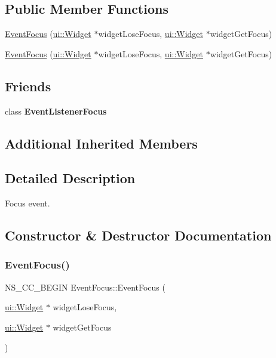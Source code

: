 \subsection*{Public Member Functions}
\begin{DoxyCompactItemize}
\item 
\hyperlink{classEventFocus_a3da2c04c020ed8e0ba5515ab065bf15e}{Event\+Focus} (\hyperlink{classui_1_1Widget}{ui\+::\+Widget} $\ast$widget\+Lose\+Focus, \hyperlink{classui_1_1Widget}{ui\+::\+Widget} $\ast$widget\+Get\+Focus)
\item 
\hyperlink{classEventFocus_ac1ec32650429e3751658af171b495a2f}{Event\+Focus} (\hyperlink{classui_1_1Widget}{ui\+::\+Widget} $\ast$widget\+Lose\+Focus, \hyperlink{classui_1_1Widget}{ui\+::\+Widget} $\ast$widget\+Get\+Focus)
\end{DoxyCompactItemize}
\subsection*{Friends}
\begin{DoxyCompactItemize}
\item 
\mbox{\label{classEventFocus_a4811ee8ad8eed5201188075866521954}} 
class {\bfseries Event\+Listener\+Focus}
\end{DoxyCompactItemize}
\subsection*{Additional Inherited Members}


\subsection{Detailed Description}
Focus event. 

\subsection{Constructor \& Destructor Documentation}
\mbox{\label{classEventFocus_a3da2c04c020ed8e0ba5515ab065bf15e}} 
\subsubsection{\texorpdfstring{Event\+Focus()}{EventFocus()}\hspace{0.1cm}{\footnotesize\ttfamily [1/2]}}
{\footnotesize\ttfamily N\+S\+\_\+\+C\+C\+\_\+\+B\+E\+G\+IN Event\+Focus\+::\+Event\+Focus (\begin{DoxyParamCaption}\item[{\hyperlink{classui_1_1Widget}{ui\+::\+Widget} $\ast$}]{widget\+Lose\+Focus,  }\item[{\hyperlink{classui_1_1Widget}{ui\+::\+Widget} $\ast$}]{widget\+Get\+Focus }\end{DoxyParamCaption})}

